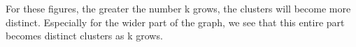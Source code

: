 \documentclass[12pt]{article}
\begin{document}
\begin{enumerate}
\begin{enumerate}
    For these figures, the greater the number k grows, the clusters will become more distinct. Especially for the wider part of the graph, we see that this entire part becomes distinct clusters as k grows. 


  \end{enumerate}


\end{enumerate}

\end{document}
